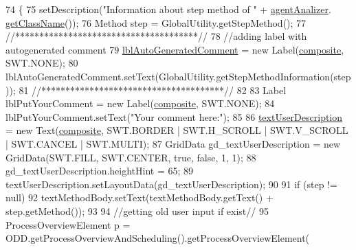 \begin{DoxyCode}
74                                   \{
75         setDescription(\textcolor{stringliteral}{"Information about step method of "} + \hyperlink{classit_1_1isislab_1_1masonassisteddocumentation_1_1mason_1_1wizards_1_1_l___step_method_page_ad5fe05afd95ed6f23ede53109ae21735}{agentAnalizer}.
      \hyperlink{classit_1_1isislab_1_1masonassisteddocumentation_1_1mason_1_1analizer_1_1_agent_analizer_a94492199c5e4873a07a2a46d15617937}{getClassName}());
76         Method step = GlobalUtility.getStepMethod();
77         \textcolor{comment}{//**************************************//}
78         \textcolor{comment}{//adding label with autogenerated comment}
79         \hyperlink{classit_1_1isislab_1_1masonassisteddocumentation_1_1mason_1_1wizards_1_1_l___step_method_page_ae387c5a1c2bc2000a32d76fa15d5002f}{lblAutoGeneratedComment} = \textcolor{keyword}{new} Label(\hyperlink{classit_1_1isislab_1_1masonassisteddocumentation_1_1mason_1_1wizards_1_1_l___step_method_page_ad8812271bc4da1c3b7d4e415d45e875d}{composite}, SWT.NONE);
80         lblAutoGeneratedComment.setText(GlobalUtility.getStepMethodInformation(step));
81         \textcolor{comment}{//**************************************//}
82         
83         Label lblPutYourComment = \textcolor{keyword}{new} Label(\hyperlink{classit_1_1isislab_1_1masonassisteddocumentation_1_1mason_1_1wizards_1_1_l___step_method_page_ad8812271bc4da1c3b7d4e415d45e875d}{composite}, SWT.NONE);
84         lblPutYourComment.setText(\textcolor{stringliteral}{"Your comment here:"});
85         
86         \hyperlink{classit_1_1isislab_1_1masonassisteddocumentation_1_1mason_1_1wizards_1_1_l___step_method_page_a6c692d610f837c964e1f6f0c8c89244c}{textUserDescription} = \textcolor{keyword}{new} Text(\hyperlink{classit_1_1isislab_1_1masonassisteddocumentation_1_1mason_1_1wizards_1_1_l___step_method_page_ad8812271bc4da1c3b7d4e415d45e875d}{composite}, SWT.BORDER | SWT.H\_SCROLL | 
      SWT.V\_SCROLL | SWT.CANCEL | SWT.MULTI);
87         GridData gd\_textUserDescription = \textcolor{keyword}{new} GridData(SWT.FILL, SWT.CENTER, \textcolor{keyword}{true}, \textcolor{keyword}{false}, 1, 1);
88         gd\_textUserDescription.heightHint = 65;
89         textUserDescription.setLayoutData(gd\_textUserDescription);
90         
91         \textcolor{keywordflow}{if} (step != null)
92             textMethodBody.setText(textMethodBody.getText() +  step.getMethod());       
93 
94         \textcolor{comment}{//getting old user input if exist//}
95         ProcessOverviewElement p = ODD.getProcessOverviewAndScheduling().getProcessOverviewElement(

\end{DoxyCode}
